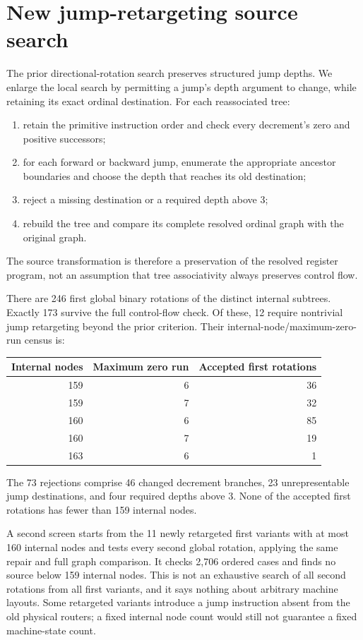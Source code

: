 \section{New jump-retargeting source search}\label{sec:retarget}

The prior directional-rotation search preserves structured jump depths.
We enlarge the local search by permitting a jump's depth argument to change,
while retaining its exact ordinal destination. For each reassociated tree:
\begin{enumerate}
\item retain the primitive instruction order and check every decrement's
zero and positive successors;
\item for each forward or backward jump, enumerate the appropriate ancestor
boundaries and choose the depth that reaches its old destination;
\item reject a missing destination or a required depth above 3;
\item rebuild the tree and compare its complete resolved ordinal graph with
the original graph.
\end{enumerate}
The source transformation is therefore a preservation of the resolved
register program, not an assumption that tree associativity always
preserves control flow.

There are 246 first global binary rotations of the distinct internal
subtrees. Exactly 173 survive the full control-flow check. Of these, 12
require nontrivial jump retargeting beyond the prior criterion. Their
internal-node/maximum-zero-run census is:
\begin{center}
\begin{tabular}{@{}rrr@{}}
\toprule
Internal nodes & Maximum zero run & Accepted first rotations\\
\midrule
159&6&36\\
159&7&32\\
160&6&85\\
160&7&19\\
163&6&1\\
\bottomrule
\end{tabular}
\end{center}
The 73 rejections comprise 46 changed decrement branches, 23 unrepresentable
jump destinations, and four required depths above 3. None of the accepted
first rotations has fewer than 159 internal nodes.

A second screen starts from the 11 newly retargeted first variants with at
most 160 internal nodes and tests every second global rotation, applying
the same repair and full graph comparison. It checks 2,706 ordered cases
and finds no source below 159 internal nodes. This is not an exhaustive
search of all second rotations from all first variants, and it says nothing
about arbitrary machine layouts. Some retargeted variants introduce a
jump instruction absent from the old physical routers; a fixed internal
node count would still not guarantee a fixed machine-state count.

